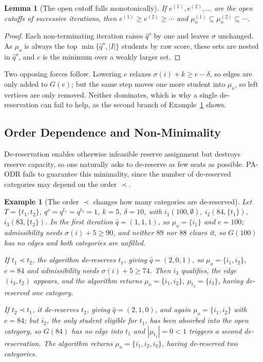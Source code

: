 \documentclass[a4paper,twoside]{article}
\newtheorem{lemma}{Lemma}
\newtheorem{example}{Example}
\theoremstyle{definition}
\begin{document}
\begin{lemma}[The open cutoff falls monotonically]
\label{lem:monotone}
If $e^{(1)},e^{(2)},\dots$ are the open cutoffs of successive iterations, then $e^{(1)}\ge e^{(2)}\ge\cdots$ and $\mu_o^{(1)}\subseteq\mu_o^{(2)}\subseteq\cdots$.
\end{lemma}

\begin{proof}
Each non-terminating iteration raises $\hat q^o$ by one and leaves $\sigma$ unchanged. As $\mu_o$ is always the top $\min\{\hat q^o,|I|\}$ students by raw score, these sets are nested in $\hat q^o$, and $e$ is the minimum over a weakly larger set.
\end{proof}

Two opposing forces follow. Lowering $e$ relaxes $\sigma(i)+k\ge e-\delta$, so edges are only added to $G(e)$; but the same step moves one more student into $\mu_o$, so left vertices are only removed. Neither dominates, which is why a single de-reservation can fail to help, as the second branch of Example~\ref{ex:order} shows.

\subsection{Order Dependence and Non-Minimality}
\label{sec:order}

De-reservation enables otherwise infeasible reserve assignment but destroys reserve capacity, so one naturally asks to de-reserve as few seats as possible. PA-ODR fails to guarantee this minimality, since the number of de-reserved categories may depend on the order $\prec$.

\begin{example}[The order $\prec$ changes how many categories are de-reserved]
\label{ex:order}
Let $T=\{t_1,t_2\}$, $q^o=q^{t_1}=q^{t_2}=1$, $k=5$, $\delta=10$, with $i_1(100,\emptyset)$, $i_2(84,\{t_1\})$, $i_3(83,\{t_2\})$. In the first iteration $\hat q=(1,1,1)$, so $\mu_o=\{i_1\}$ and $e=100$; admissibility needs $\sigma(i)+5\ge90$, and neither $89$ nor $88$ clears it, so $G(100)$ has no edges and both categories are unfilled.

\emph{If $t_1\prec t_2$}, the algorithm de-reserves $t_1$, giving $\hat q=(2,0,1)$, so $\mu_o=\{i_1,i_2\}$, $e=84$ and admissibility needs $\sigma(i)+5\ge74$. Then $i_3$ qualifies, the edge $(i_3,t_2)$ appears, and the algorithm returns $\mu_o=\{i_1,i_2\}$, $\mu_{t_2}=\{i_3\}$, having de-reserved one category.

\emph{If $t_2\prec t_1$}, it de-reserves $t_2$, giving $\hat q=(2,1,0)$, and again $\mu_o=\{i_1,i_2\}$ with $e=84$; but $i_2$, the only student eligible for $t_1$, has been absorbed into the open category, so $G(84)$ has no edge into $t_1$ and $|\mu_{t_1}|=0<1$ triggers a second de-reservation. The algorithm returns $\mu_o=\{i_1,i_2,i_3\}$, having de-reserved two categories.
\end{example}
\end{document}
